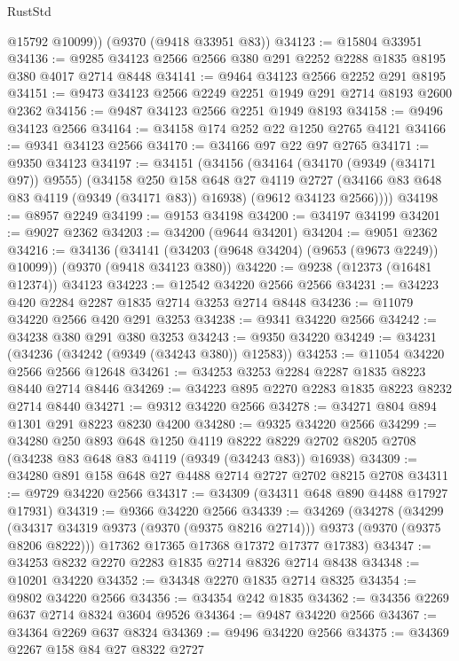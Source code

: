 \begin{lexlean}{RustStd}
\begin{coremodule}
        @15792
        @10099))
    (@9370 (@9418 @33951 @83))
@34123 := @15804 @33951
@34136 := @9285 @34123 @2566 @2566 @380 @291 @2252 @2288 @1835 @8195 @380 @4017 @2714 @8448
@34141 := @9464 @34123 @2566 @2252 @291 @8195
@34151 := @9473 @34123 @2566 @2249 @2251 @1949 @291 @2714 @8193 @2600 @2362
@34156 := @9487 @34123 @2566 @2251 @1949 @8193
@34158 := @9496 @34123 @2566
@34164 := @34158 @174 @252 @22 @1250 @2765 @4121
@34166 := @9341 @34123 @2566
@34170 := @34166 @97 @22 @97 @2765
@34171 := @9350 @34123
@34197 := @34151
    (@34156
      (@34164
        (@34170 (@9349 (@34171 @97)) @9555)
        (@34158
          @250
          @158
          @648
          @27
          @4119
          @2727
          (@34166 @83 @648 @83 @4119 (@9349 (@34171 @83)) @16938)
          (@9612 @34123 @2566))))
@34198 := @8957 @2249
@34199 := @9153 @34198
@34200 := @34197 @34199
@34201 := @9027 @2362
@34203 := @34200 (@9644 @34201)
@34204 := @9051 @2362
@34216 := @34136
    (@34141 (@34203 (@9648 @34204) (@9653 (@9673 @2249)) @10099))
    (@9370 (@9418 @34123 @380))
@34220 := @9238 (@12373 (@16481 @12374)) @34123
@34223 := @12542 @34220 @2566 @2566
@34231 := @34223 @420 @2284 @2287 @1835 @2714 @3253 @2714 @8448
@34236 := @11079 @34220 @2566 @420 @291 @3253
@34238 := @9341 @34220 @2566
@34242 := @34238 @380 @291 @380 @3253
@34243 := @9350 @34220
@34249 := @34231 (@34236 (@34242 (@9349 (@34243 @380)) @12583))
@34253 := @11054 @34220 @2566 @2566 @12648
@34261 := @34253 @3253 @2284 @2287 @1835 @8223 @8440 @2714 @8446
@34269 := @34223 @895 @2270 @2283 @1835 @8223 @8232 @2714 @8440
@34271 := @9312 @34220 @2566
@34278 := @34271 @804 @894 @1301 @291 @8223 @8230 @4200
@34280 := @9325 @34220 @2566
@34299 := @34280
    @250
    @893
    @648
    @1250
    @4119
    @8222
    @8229
    @2702
    @8205
    @2708
    (@34238 @83 @648 @83 @4119 (@9349 (@34243 @83)) @16938)
@34309 := @34280 @891 @158 @648 @27 @4488 @2714 @2727 @2702 @8215 @2708
@34311 := @9729 @34220 @2566
@34317 := @34309 (@34311 @648 @890 @4488 @17927 @17931)
@34319 := @9366 @34220 @2566
@34339 := @34269
    (@34278
      (@34299 (@34317 @34319 @9373 (@9370 (@9375 @8216 @2714))) @9373 (@9370 (@9375 @8206 @8222)))
      @17362
      @17365
      @17368
      @17372
      @17377
      @17383)
@34347 := @34253 @8232 @2270 @2283 @1835 @2714 @8326 @2714 @8438
@34348 := @10201 @34220
@34352 := @34348 @2270 @1835 @2714 @8325
@34354 := @9802 @34220 @2566
@34356 := @34354 @242 @1835
@34362 := @34356 @2269 @637 @2714 @8324 @3604 @9526
@34364 := @9487 @34220 @2566
@34367 := @34364 @2269 @637 @8324
@34369 := @9496 @34220 @2566
@34375 := @34369 @2267 @158 @84 @27 @8322 @2727

\end{coremodule}
\end{lexlean}
